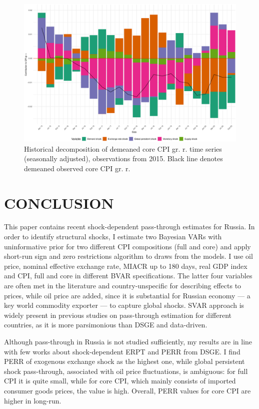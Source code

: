 \documentclass[12pt, a4paper]{extarticle}
\begin{document}
\begin{figure}
	\centering
	\includegraphics[width=0.95\linewidth]{figures/hd_core_cpi_cut}
	\caption[]{Historical decomposition of demeaned core CPI gr. r. time series (seasonally adjusted), observations from 2015. Black line denotes demeaned observed core CPI gr. r.}
	\label{fig:hd_core_cpi_cut}
\end{figure}



\clearpage
\section*{CONCLUSION}

This paper contains recent shock-dependent pass-through estimates for Russia. In order to identify structural shocks, I estimate two Bayesian VARs with uninformative prior for two different CPI compositions (full and core) and apply short-run sign and zero restrictions algorithm to draws from the models. I use oil price, nominal effective exchange rate, MIACR up to 180 days, real GDP index and CPI, full and core in different BVAR specifications. The latter four variables are often met in the literature and country-unspecific for describing effects to prices, while oil price are added, since it is substantial for Russian economy --- a key world commodity exporter --- to capture global shocks. SVAR approach is widely present in previous studies on pass-through estimation for different countries, as it is more parsimonious than DSGE and data-driven.

Although pass-through in Russia is not studied sufficiently, my results are in line with few works about shock-dependent ERPT and PERR from DSGE. I find PERR of exogenous exchange shock as the highest one, while global persistent shock pass-through, associated with oil price fluctuations, is ambiguous: for full CPI it is quite small, while for core CPI, which mainly consists of imported consumer goods prices, the value is high. Overall, PERR values for core CPI are higher in long-run.
\end{document}
